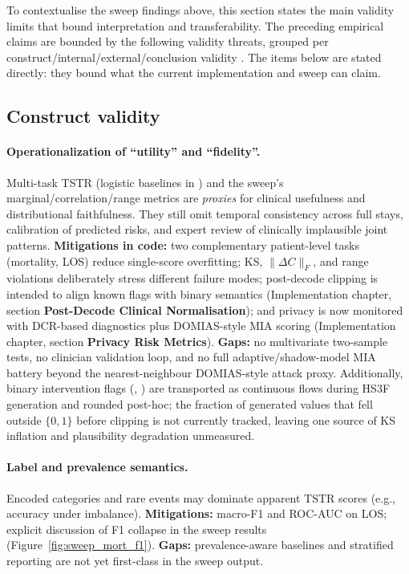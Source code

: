 To contextualise the sweep findings above, this section states the main validity limits that bound interpretation and transferability.
The preceding empirical claims are bounded by the following validity threats, grouped per construct/internal/external/conclusion validity \cite{runesonHost2009CaseStudyGuidelines}.
The items below are stated directly: they bound what the current implementation and sweep can claim.

\subsection{Construct validity}

\paragraph{Operationalization of ``utility'' and ``fidelity''.}
Multi-task TSTR (logistic baselines in ) and the sweep's marginal/correlation/range metrics are \emph{proxies} for clinical usefulness and distributional faithfulness.
They still omit temporal consistency across full stays, calibration of predicted risks, and expert review of clinically implausible joint patterns.
\textbf{Mitigations in code:} two complementary patient-level tasks (mortality, LOS) reduce single-score overfitting; KS, $\|\Delta C\|_F$, and range violations deliberately stress different failure modes; post-decode clipping is intended to align known flags with binary semantics (Implementation chapter, section \textbf{Post-Decode Clinical Normalisation}); and privacy is now monitored with DCR-based diagnostics plus DOMIAS-style MIA scoring (Implementation chapter, section \textbf{Privacy Risk Metrics}).
\textbf{Gaps:} no multivariate two-sample tests, no clinician validation loop, and no full adaptive/shadow-model MIA battery beyond the nearest-neighbour DOMIAS-style attack proxy. Additionally, binary intervention flags (, ) are transported as continuous flows during HS3F generation and rounded post-hoc; the fraction of generated values that fell outside $\{0,1\}$ before clipping is not currently tracked, leaving one source of KS inflation and plausibility degradation unmeasured.

\paragraph{Label and prevalence semantics.}
Encoded categories and rare events may dominate apparent TSTR scores (e.g., accuracy under imbalance).
\textbf{Mitigations:} macro-F1 and ROC-AUC on LOS; explicit discussion of F1 collapse in the sweep results (Figure~\ref{fig:sweep_mort_f1}).
\textbf{Gaps:} prevalence-aware baselines and stratified reporting are not yet first-class in the sweep output.

